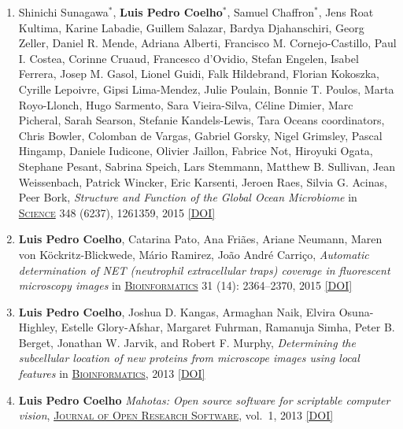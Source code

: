 \documentclass{article}
\newcommand\showdoi[1]{%
    \href{http://dx.doi.org/#1}{[DOI]}%
}
\newcommand\pubname[1]{\textsc{\uline{#1}}}
\newcommand\contribution[1]{\relax}
\newcommand\costar{${}^{*}$}
\begin{document}
\begin{enumerate}[resume]
\item Shinichi Sunagawa\costar, \textbf{Luis Pedro Coelho}\costar, Samuel
Chaffron\costar, Jens Roat Kultima, Karine Labadie, Guillem Salazar, Bardya
Djahanschiri, Georg Zeller, Daniel R. Mende, Adriana Alberti, Francisco M.
Cornejo-Castillo, Paul I. Costea, Corinne Cruaud, Francesco d'Ovidio, Stefan
Engelen, Isabel Ferrera, Josep M. Gasol, Lionel Guidi, Falk Hildebrand, Florian
Kokoszka, Cyrille Lepoivre, Gipsi Lima-Mendez, Julie Poulain, Bonnie T. Poulos,
Marta Royo-Llonch, Hugo Sarmento, Sara Vieira-Silva, Céline Dimier, Marc
Picheral, Sarah Searson, Stefanie Kandels-Lewis, Tara Oceans coordinators,
Chris Bowler, Colomban de Vargas, Gabriel Gorsky, Nigel Grimsley, Pascal
Hingamp, Daniele Iudicone, Olivier Jaillon, Fabrice Not, Hiroyuki Ogata,
Stephane Pesant, Sabrina Speich, Lars Stemmann, Matthew B. Sullivan, Jean
Weissenbach, Patrick Wincker, Eric Karsenti, Jeroen Raes, Silvia G. Acinas,
Peer Bork, \emph{Structure and Function of the Global Ocean Microbiome} in
\pubname{Science} 348 (6237), 1261359, 2015 \showdoi{10.1126/science.1261359}
\contribution{As co-first author, I performed analysis of the data, including
linking the metagenomics data to the environmental parameters, as well as the
comparison to the human gut (this required extending existing software tools
which were unable to scale to this dataset); and helped draft the manuscript.}

\item \textbf{Luis Pedro Coelho}, Catarina Pato, Ana Friães, Ariane Neumann,
Maren von Köckritz-Blickwede, Mário Ramirez, João André Carriço,
\emph{Automatic determination of NET (neutrophil extracellular traps) coverage
in fluorescent microscopy images} in \pubname{Bioinformatics} 31 (14):
2364--2370, 2015 \showdoi{10.1093/bioinformatics/btv156}
\contribution{I conceived and implemented the algorithm, and wrote the
manuscript.}

\item \textbf{Luis Pedro Coelho}, Joshua D. Kangas, Armaghan Naik, Elvira
Osuna-Highley, Estelle Glory-Afshar, Margaret Fuhrman, Ramanuja Simha, Peter B.
Berget, Jonathan W. Jarvik, and Robert F. Murphy, \emph{Determining the
subcellular location of new proteins from microscope images using local
features} in \pubname{Bioinformatics}, 2013 \showdoi{10.1093/bioinformatics/btt392}
\contribution{I designed and implemented the proposed algorithm, collected
microscopy data (in collaboration with other authors), and wrote the
manuscript.}

\item \textbf{Luis Pedro Coelho} \emph{Mahotas: Open source software for
scriptable computer vision}, \pubname{Journal of Open Research Software}, vol.\
1, 2013 \showdoi{10.5334/jors.ac}
\contribution{I implemented the underlying computer vision software and the manuscript.}


\end{enumerate}
\end{document}
